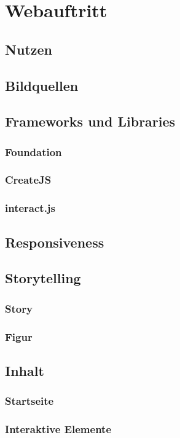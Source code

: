 \chapter{Webauftritt}
\section{Nutzen}
\section{Bildquellen}
\section{Frameworks und Libraries}
\subsection{Foundation}
\subsection{CreateJS}
\subsection{interact.js}
\section{Responsiveness}
\section{Storytelling}
\subsection{Story}
\subsection{Figur}

\section{Inhalt}
\subsection{Startseite}

\subsection{Interaktive Elemente}


